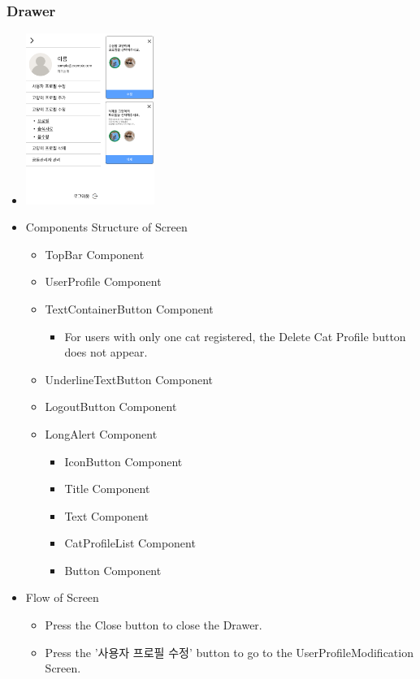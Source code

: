 \documentclass[conference]{IEEEtran}
\begin{document}
\subsubsection{Drawer}
\begin{itemize}
    \item[] \includegraphics[width=0.33\textwidth]{img/D/17.png}
    \item Components Structure of Screen
    \begin{itemize}
        \item TopBar Component
        \item UserProfile Component
        \item TextContainerButton Component
        \begin{itemize}
            \item For users with only one cat registered, the Delete Cat Profile button does not appear.
        \end{itemize}
        \item UnderlineTextButton Component
        \item LogoutButton Component
        \item LongAlert Component
        \begin{itemize}
            \item IconButton Component
            \item Title Component
            \item Text Component
            \item CatProfileList Component
            \item Button Component
        \end{itemize}
    \end{itemize}
    \item Flow of Screen
    \begin{itemize}
        \item Press the Close button to close the Drawer.
        \item Press the '사용자 프로필 수정' button to go to the UserProfileModification Screen.

\end{itemize}
\end{itemize}
\end{document}
